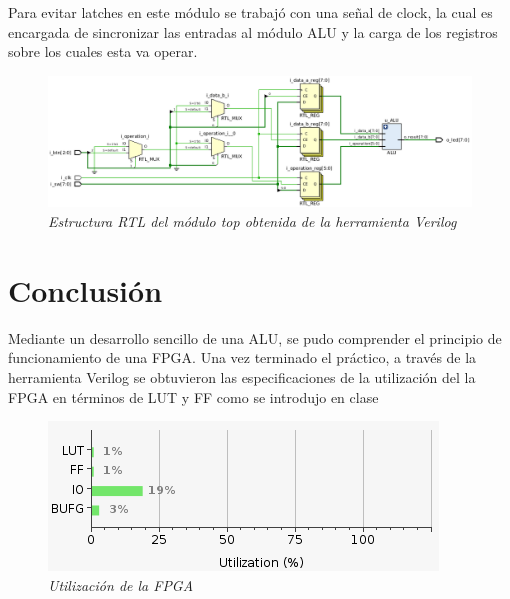 \documentclass[12pt,A4paper,titlepage]{article}
\begin{document}
Para evitar latches en este módulo se trabajó con una señal de clock, la cual es encargada de sincronizar las entradas al módulo ALU y la carga de los registros sobre los cuales esta va operar. 

\begin{figure}[H] 
	\centering
	\includegraphics[scale=0.55]{figure/rtl-top.png}
	\caption{\textit{Estructura RTL del módulo top obtenida de la herramienta Verilog}}
\end{figure}

\newpage
\section{Conclusión}
Mediante un desarrollo sencillo de una ALU, se pudo comprender el principio de funcionamiento de una FPGA. Una vez terminado el práctico, a través de la herramienta Verilog se obtuvieron las especificaciones de la utilización del la FPGA en términos de LUT y FF como se introdujo en clase 

\begin{figure}[H] 
	\centering
	\includegraphics[scale=0.7]{figure/utilizacion.png}
	\caption{\textit{Utilización de la FPGA}}
\end{figure}
\end{document}
